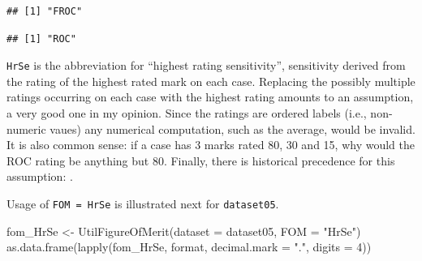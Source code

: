 \documentclass[
]{book}
\newenvironment{Shaded}{\begin{snugshade}}{\end{snugshade}}
\newcommand{\AttributeTok}[1]{\textcolor[rgb]{0.77,0.63,0.00}{#1}}
\newcommand{\DecValTok}[1]{\textcolor[rgb]{0.00,0.00,0.81}{#1}}
\newcommand{\FunctionTok}[1]{\textcolor[rgb]{0.00,0.00,0.00}{#1}}
\newcommand{\NormalTok}[1]{#1}
\newcommand{\OtherTok}[1]{\textcolor[rgb]{0.56,0.35,0.01}{#1}}
\newcommand{\SpecialCharTok}[1]{\textcolor[rgb]{0.00,0.00,0.00}{#1}}
\newcommand{\StringTok}[1]{\textcolor[rgb]{0.31,0.60,0.02}{#1}}
\begin{document}
\begin{Shaded}
\end{Shaded}

\begin{verbatim}
## [1] "FROC"
\end{verbatim}

\begin{Shaded}
\end{Shaded}

\begin{verbatim}
## [1] "ROC"
\end{verbatim}

\texttt{HrSe} is the abbreviation for ``highest rating sensitivity'', sensitivity derived from the rating of the highest rated mark on each case. Replacing the possibly multiple ratings occurring on each case with the highest rating amounts to an assumption, a very good one in my opinion. Since the ratings are ordered labels (i.e., non-numeric vaues) any numerical computation, such as the average, would be invalid. It is also common sense: if a case has 3 marks rated 80, 30 and 15, why would the ROC rating be anything but 80. Finally, there is historical precedence for this assumption: \citep{bunch1977free, swensson1996unified}.

Usage of \texttt{FOM\ =\ HrSe} is illustrated next for \texttt{dataset05}.

\begin{Shaded}
\begin{Highlighting}[]
\NormalTok{fom\_HrSe }\OtherTok{\textless{}{-}} \FunctionTok{UtilFigureOfMerit}\NormalTok{(}\AttributeTok{dataset =}\NormalTok{ dataset05, }\AttributeTok{FOM =} \StringTok{"HrSe"}\NormalTok{)}
\FunctionTok{as.data.frame}\NormalTok{(}\FunctionTok{lapply}\NormalTok{(fom\_HrSe, format, }\AttributeTok{decimal.mark =} \StringTok{"."}\NormalTok{, }\AttributeTok{digits =} \DecValTok{4}\NormalTok{))}
\end{Highlighting}
\end{Shaded}
\end{document}

